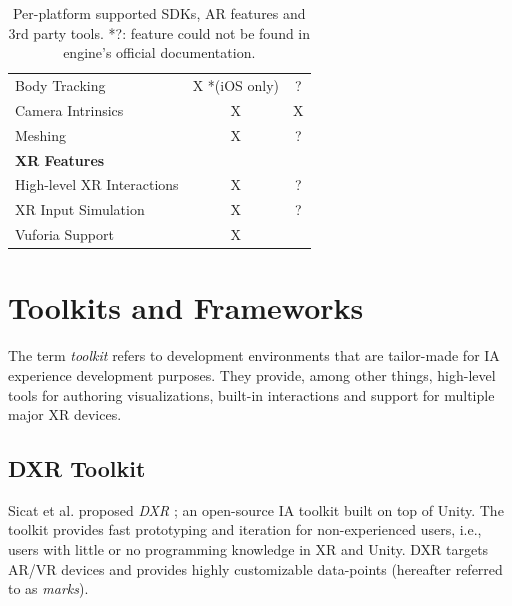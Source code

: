 \documentclass{vgtc}                          %
\begin{document}
\begin{table}
\begin{tabular}{l c c}
		Body Tracking                 & X *(iOS only)                         & ?                        \\
		Camera Intrinsics             & X                                     & X                        \\
		Meshing                       & X                                     & ?                        \\
		\midrule
		\textbf{XR Features}          &                                       &                          \\
		\midrule
		High-level XR Interactions    & X                                     & ?                        \\
		XR Input Simulation           & X                                     & ?                        \\
		\midrule
		Vuforia Support               & X                                     &                          \\
		\bottomrule
	\end{tabular}


	\medskip

	\caption{Per-platform supported SDKs, AR features and 3rd party tools. *?:
		feature could not be found in engine's official documentation.}
	\label{table:1}
\end{table}

\section{Toolkits and Frameworks}

The term \textit{toolkit} refers to development environments that are tailor-made for
IA experience development purposes. They provide, among other things,
high-level tools for authoring visualizations, built-in interactions and
support for multiple major XR devices.

\subsection{DXR Toolkit}

\noindent Sicat et al. proposed \textit{DXR} \cite{dxr_toolkit}; an open-source \cite{dxr:repo} IA toolkit
built on top of Unity. The toolkit provides fast prototyping and iteration for non-experienced users, i.e.,
users with little or no programming knowledge in XR and Unity. DXR targets AR/VR devices and provides highly
customizable data-points (hereafter referred to as \textit{marks}).
\end{document}

